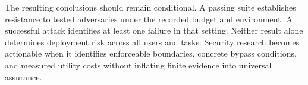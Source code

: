 The resulting conclusions should remain conditional. A passing suite establishes resistance to tested adversaries under the recorded budget and environment. A successful attack identifies at least one failure in that setting. Neither result alone determines deployment risk across all users and tasks. Security research becomes actionable when it identifies enforceable boundaries, concrete bypass conditions, and measured utility costs without inflating finite evidence into universal assurance.
